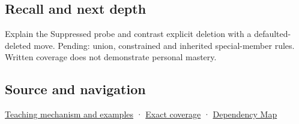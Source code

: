 \subsection{Recall and next depth}\label{appendix-42e02a12c694-recall-and-next-depth}

Explain the Suppressed probe and contrast explicit deletion with a defaulted-deleted move. Pending: union, constrained and inherited special-member rules. Written coverage does not demonstrate personal mastery.

\subsection{Source and navigation}\label{appendix-42e02a12c694-source-and-navigation}

\hyperref[01-foundations-i-ch003-let-the-compiler-compose-the-operations]{Teaching mechanism and examples} · \hyperref[appendix-fd090d982a15-m009---parts-127-147]{Exact coverage} · \hyperref[appendix-4ad47bdd269a]{Dependency Map}
